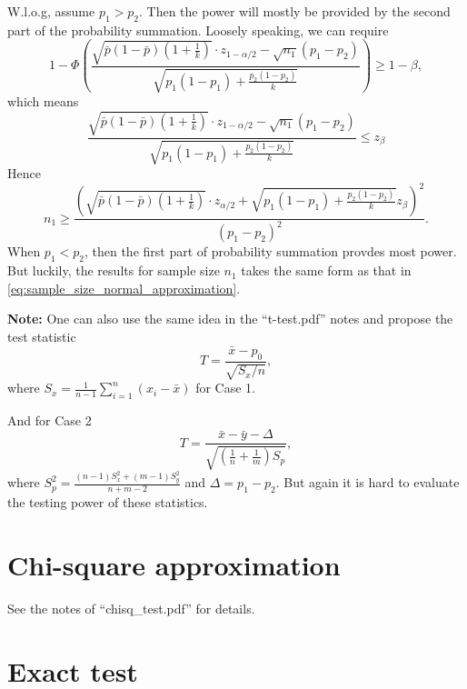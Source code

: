 \documentclass[a4paper,12pt]{article}
\begin{document}
W.l.o.g, assume $p_1 > p_2$. Then the power will mostly be provided by the second part of the probability summation. Loosely speaking, we can require
\[
  1 -
  \Phi\left(
    \frac{
      \sqrt{\bar{p}\left(1 - \bar{p}\right)\left(1 + \frac{1}{k}\right)}
      \cdot z_{1 - \alpha / 2}
      -\sqrt{n_1}\left(p_1 - p_2\right)
    }{
      \sqrt{
        p_1\left(1 - p_1\right)
        + \frac{p_2\left(1 - p_2\right)}{k}
      }
    }
  \right)
  \geq 1 - \beta
  ,
\]
which means
\[
  \frac{
    \sqrt{\bar{p}\left(1 - \bar{p}\right)\left(1 + \frac{1}{k}\right)}
    \cdot z_{1 - \alpha / 2}
    -\sqrt{n_1}\left(p_1 - p_2\right)
  }{
    \sqrt{
      p_1\left(1 - p_1\right)
      + \frac{p_2\left(1 - p_2\right)}{k}
    }
  }
  \leq z_{\beta}
\]
Hence
\begin{equation}
  \label{eq:sample_size_normal_approximation}
    n_1 \geq \frac{\left(
      \sqrt{\bar{p}\left(1 - \bar{p}\right)\left(1 + \frac{1}{k}\right)}
      \cdot z_{\alpha / 2}
      + \sqrt{
      p_1\left(1 - p_1\right)
      + \frac{p_2\left(1 - p_2\right)}{k}
    }
    z_{\beta}
    \right)^2
  }{\left(p_1 - p_2\right)^2}
  .
\end{equation}
When $p_1 < p_2$, then the first part of probability summation provdes most power. But luckily, the results for sample size $n_1$ takes the same form as that in \eqref{eq:sample_size_normal_approximation}.
\par
\textbf{Note: } One can also use the same idea in the ``t-test.pdf'' notes and propose the test statistic
\[
  T = \frac{\bar{x} - p_0}{\sqrt{S_x / n}}
  ,
\]
where $S_x = \frac{1}{n - 1}\sum\limits_{i = 1}^n\left(x_i - \bar{x}\right)$ for Case 1.
\par
And for Case 2
\[
  T = \frac{\bar{x} - \bar{y} - \Delta}{\sqrt{
      \left(\frac{1}{n} + \frac{1}{m}\right)S_p
    }}
  ,
\]
where $S_p^2 = \frac{\left(n - 1\right)S_x^2 + \left(m - 1\right)S_y^2}{n + m - 2}$ and $\Delta = p_1 - p_2$. But again it is hard to evaluate the testing power of these statistics.


\section{Chi-square approximation}
\label{sec:chi-square-appr}

See the notes of ``chisq\_test.pdf'' for details.


\section{Exact test}
\label{sec:exact-test}
\end{document}
